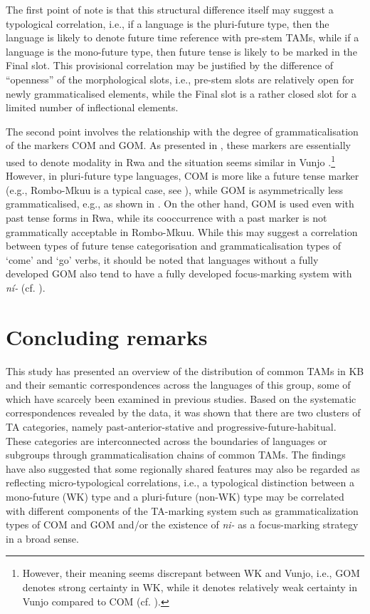 \documentclass[output=paper]{langscibook}
\begin{document}
The first point of note is that this structural difference itself may suggest a typological correlation, i.e., if a language is the pluri-future type, then the language is likely to denote future time reference with pre-stem TAMs, while if a language is the mono-future type, then future tense is likely to be marked in the Final slot. This provisional correlation may be justified by the difference of “openness” of the morphological slots, i.e., pre-stem slots are relatively open for newly grammaticalised elements, while the Final slot is a rather closed slot for a limited number of inflectional elements.

The second point involves the relationship with the degree of grammaticalisation of the markers COM and GOM. As presented in , these markers are essentially used to denote modality in Rwa and the situation seems similar in Vunjo \citep{Nurse2003a}.\footnote{However, their meaning seems discrepant between WK and Vunjo, i.e., GOM denotes strong certainty in WK, while it denotes relatively weak certainty in Vunjo compared to COM (cf. \citealt{ShinagawaForthcoming-a}).} However, in pluri-future type languages, COM is more like a future tense marker (e.g., Rombo-Mkuu is a typical case, see ), while GOM is asymmetrically less grammaticalised, e.g., as shown in . On the other hand, GOM is used even with past tense forms in Rwa, while its cooccurrence with a past marker is not grammatically acceptable in Rombo-Mkuu. While this may suggest a correlation between types of future tense categorisation and grammaticalisation types of ‘come’ and ‘go’ verbs, it should be noted that languages without a fully developed GOM also tend to have a fully developed focus-marking system with \textit{ní-} (cf. \citealt{Shinagawa2015, ShinagawaForthcoming-b}).


\section{Concluding remarks}\label{sec:shinagawa:5}

This study has presented an overview of the distribution of common TAMs in KB and their semantic correspondences across the languages of this group, some of which have scarcely been examined in previous studies. Based on the systematic correspondences revealed by the data, it was shown that there are two clusters of TA categories, namely past-anterior-stative and progressive-future-habitual. These categories are interconnected across the boundaries of languages or subgroups through grammaticalisation chains of common TAMs. The findings have also suggested that some regionally shared features may also be regarded as reflecting micro-typological correlations, i.e., a typological distinction between a mono-future (WK) type and a pluri-future (non-WK) type may be correlated with different components of the TA-marking system such as grammaticalization types of COM and GOM and/or the existence of \textit{ni-} as a focus-marking strategy in a broad sense.
\end{document}
